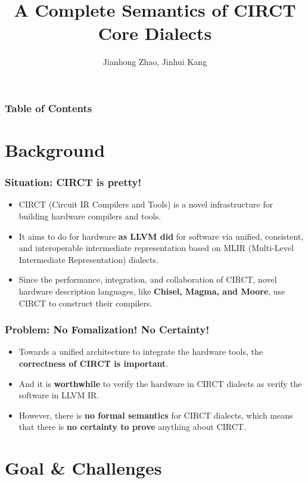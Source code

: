 \documentclass{beamer}
\title[A Complete Semantics of CIRCT Core Dialects]{A Complete Semantics of CIRCT Core Dialects}
\author{Jianhong Zhao, Jinhui Kang}
\begin{document}
\begin{frame}
  \titlepage
\end{frame}


\begin{frame}
    \frametitle{Table of Contents}
    \tableofcontents
\end{frame}


\section{Background}

\begin{frame}
    \frametitle{Situation: CIRCT is pretty!}    
    \begin{itemize}
        \item CIRCT (Circuit IR Compilers and Tools) is a novel infrastructure for building hardware compilers and tools.
        \item It aims to do for hardware \textbf{as LLVM did} for software via unified, consistent, and interoperable intermediate representation based on MLIR (Multi-Level Intermediate Representation) dialects.
        \item Since the performance, integration, and collaboration of CIRCT, novel hardware description languages, like \textbf{Chisel, Magma, and Moore}, use CIRCT to construct their compilers.
    \end{itemize}
\end{frame}

\begin{frame}
    \frametitle{Problem: No Fomalization! No Certainty!}
    \begin{itemize}
        \item Towards a unified architecture to integrate the hardware tools, the \textbf{correctness of CIRCT is important}.
        \item And it is \textbf{worthwhile} to verify the hardware in CIRCT dialects as verify the software in LLVM IR.
        \item However, there is \textbf{no formal semantics} for CIRCT dialects, which means that there is \textbf{no certainty to prove} anything about CIRCT.
    \end{itemize}
\end{frame}

\section{Goal \& Challenges}
\end{document}
